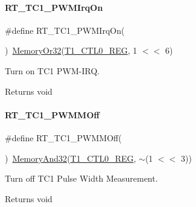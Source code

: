 \paragraph{\texorpdfstring{R\+T\+\_\+\+T\+C1\+\_\+\+P\+W\+M\+Irq\+On}{RT\_TC1\_PWMIrqOn}}
{\footnotesize\ttfamily \#define R\+T\+\_\+\+T\+C1\+\_\+\+P\+W\+M\+Irq\+On(\begin{DoxyParamCaption}{ }\end{DoxyParamCaption})~\mbox{\hyperlink{a00020_a27874a97deab7cecdde5ddecf466e31e}{Memory\+Or32}}(\mbox{\hyperlink{a00020_adadaa0ab1ebbd7ba9b70dfd24c3ed44da38632250c2e72df96fcaa3f8bd8ecc5e}{T1\+\_\+\+C\+T\+L0\+\_\+\+R\+EG}}, 1 $<$$<$ 6)}



Turn on T\+C1 P\+W\+M-\/\+I\+RQ. 

\begin{DoxyReturn}{Returns}
void 
\end{DoxyReturn}
\mbox{\label{a00044_aa070a043272a38ae84492146683a00d3}} 
\paragraph{\texorpdfstring{R\+T\+\_\+\+T\+C1\+\_\+\+P\+W\+M\+M\+Off}{RT\_TC1\_PWMMOff}}
{\footnotesize\ttfamily \#define R\+T\+\_\+\+T\+C1\+\_\+\+P\+W\+M\+M\+Off(\begin{DoxyParamCaption}{ }\end{DoxyParamCaption})~\mbox{\hyperlink{a00020_ad87cedffcaadc51db22594fce55173d4}{Memory\+And32}}(\mbox{\hyperlink{a00020_adadaa0ab1ebbd7ba9b70dfd24c3ed44da38632250c2e72df96fcaa3f8bd8ecc5e}{T1\+\_\+\+C\+T\+L0\+\_\+\+R\+EG}}, $\sim$(1 $<$$<$ 3))}



Turn off T\+C1 Pulse Width Measurement. 

\begin{DoxyReturn}{Returns}
void 
\end{DoxyReturn}
\mbox{\label{a00044_a6f11e47b5a8e7947fc76e9955e94acea}} 
